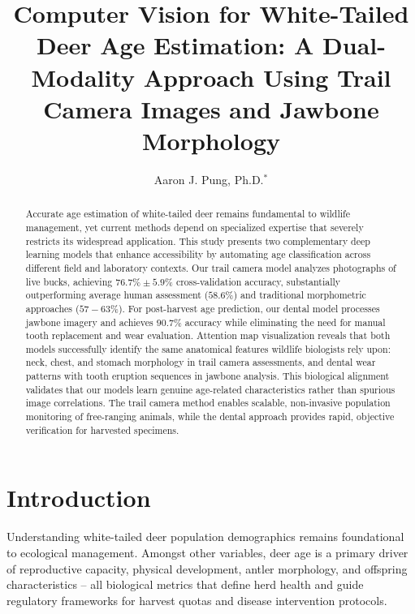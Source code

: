 \documentclass{iopjournal}
\begin{document}

\title{Computer Vision for White-Tailed Deer Age Estimation: A Dual-Modality Approach Using Trail Camera Images and Jawbone Morphology}

\author{Aaron J. Pung, Ph.D.$^{*}$}



\begin{abstract}
Accurate age estimation of white-tailed deer remains fundamental to wildlife management, yet current methods depend on specialized expertise that severely restricts its widespread application. This study presents two complementary deep learning models that enhance accessibility by automating age classification across different field and laboratory contexts. Our trail camera model analyzes photographs of live bucks, achieving $76.7\% \pm 5.9\%$ cross-validation accuracy, substantially outperforming average human assessment ($58.6\%$) and traditional morphometric approaches ($57-63\%$). For post-harvest age prediction, our dental model processes jawbone imagery and achieves $90.7\%$ accuracy while eliminating the need for manual tooth replacement and wear evaluation. Attention map visualization reveals that both models successfully identify the same anatomical features wildlife biologists rely upon: neck, chest, and stomach morphology in trail camera assessments, and dental wear patterns with tooth eruption sequences in jawbone analysis. This biological alignment validates that our models learn genuine age-related characteristics rather than spurious image correlations. The trail camera method enables scalable, non-invasive population monitoring of free-ranging animals, while the dental approach provides rapid, objective verification for harvested specimens.
\end{abstract}

\section{Introduction}
Understanding white-tailed deer population demographics remains foundational to ecological management. Amongst other variables, deer age is a primary driver of reproductive capacity, physical development, antler morphology, and offspring characteristics -- all biological metrics that define herd health and guide regulatory frameworks for harvest quotas and disease intervention protocols.
\end{document}

